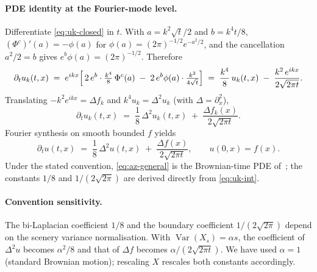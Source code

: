 \documentclass[11pt,reqno]{amsart}
\theoremstyle{plain}
\theoremstyle{definition}
\theoremstyle{remark}
\DeclareMathOperator{\Var}{Var}
\begin{document}
\paragraph{PDE identity at the Fourier-mode level.}
Differentiate \eqref{eq:uk-closed} in $t$. With $a=k^{2}\sqrt t/2$
and $b=k^{4}t/8$, $(\Phi^{c})'(a)=-\phi(a)$ for
$\phi(a)=(2\pi)^{-1/2}e^{-a^{2}/2}$, and the cancellation
$a^{2}/2=b$ gives $e^{b}\phi(a)=(2\pi)^{-1/2}$. Therefore
\begin{equation}\label{eq:uk-pde}
  \partial_t u_k(t,x)
  \;=\;e^{ikx}\Bigl[\,2\,e^{b}\cdot\tfrac{k^{4}}{8}\,\Phi^{c}(a)
       \;-\;2\,e^{b}\phi(a)\cdot\tfrac{k^{2}}{4\sqrt{t}}\Bigr]
  \;=\;\frac{k^{4}}{8}\,u_k(t,x)\;-\;\frac{k^{2}\,e^{ikx}}{2\sqrt{2\pi t}}.
\end{equation}
Translating $-k^{2}e^{ikx}=\Delta f_k$ and $k^{4}u_k=\Delta^{2}u_k$
(with $\Delta=\partial_x^{2}$),
\begin{equation}\label{eq:az-fourier}
  \partial_t u_k(t,x)
  \;=\;\frac{1}{8}\,\Delta^{2}u_k(t,x)
       \;+\;\frac{\Delta f_k(x)}{2\sqrt{2\pi t}}.
\end{equation}
Fourier synthesis on smooth bounded $f$ yields
\begin{equation}\label{eq:az-general}
  \partial_t u(t,x)
  \;=\;\frac{1}{8}\,\Delta^{2}u(t,x)
       \;+\;\frac{\Delta f(x)}{2\sqrt{2\pi t}},
  \qquad u(0,x)=f(x).
\end{equation}
Under the stated convention, \eqref{eq:az-general} is the Brownian-time
PDE of~\cite{AllouZheng}; the constants $1/8$ and $1/(2\sqrt{2\pi})$
are derived directly from \eqref{eq:uk-int}.

\paragraph{Convention sensitivity.} The bi-Laplacian coefficient $1/8$
and the boundary coefficient $1/(2\sqrt{2\pi})$ depend on the scenery
variance normalisation. With $\Var(X_s)=\alpha s$, the coefficient of
$\Delta^{2}u$ becomes $\alpha^{2}/8$ and that of $\Delta f$ becomes
$\alpha/(2\sqrt{2\pi t})$. We have used $\alpha=1$ (standard Brownian
motion); rescaling $X$ rescales both constants accordingly.
\end{document}
